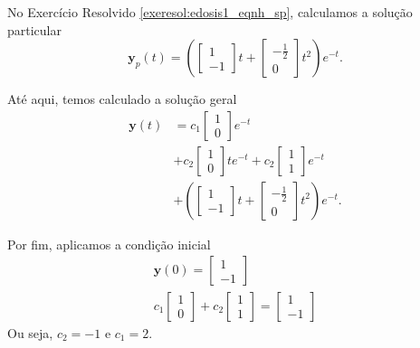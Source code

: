 \begin{resol}
    No Exercício Resolvido \ref{exeresol:edosis1_eqnh_sp}, calculamos a solução particular
    \begin{equation}
      \pmb{y}_p(t) = \left(
      \begin{bmatrix}
        1 \\
        -1
      \end{bmatrix}t +
      \begin{bmatrix}
        -\frac{1}{2} \\
        0
      \end{bmatrix}t^2\right)e^{-t}.
  \end{equation}

  Até aqui, temos calculado a solução geral
  \begin{align}
    \pmb{y}(t) &= c_1\begin{bmatrix}
                     1 \\ 0
                   \end{bmatrix}e^{-t} \\
               &+ c_2\begin{bmatrix}
                     1 \\
                     0
                   \end{bmatrix}te^{-t} +
      c_2\begin{bmatrix}
        1 \\ 1
      \end{bmatrix}e^{-t} \\
               &+ \left(
      \begin{bmatrix}
        1 \\
        -1
      \end{bmatrix}t +
      \begin{bmatrix}
        -\frac{1}{2} \\
        0
      \end{bmatrix}t^2\right)e^{-t}.
  \end{align}

  Por fim, aplicamos a condição inicial
  \begin{gather}
    \pmb{y}(0) =
    \begin{bmatrix}
      1 \\ -1
    \end{bmatrix} \\
    c_1
    \begin{bmatrix}
      1\\ 0
    \end{bmatrix} + c_2
    \begin{bmatrix}
      1\\1
    \end{bmatrix} =     \begin{bmatrix}
      1 \\ -1
    \end{bmatrix}
  \end{gather}
  Ou seja, $c_2=-1$ e $c_1=2$.


\end{resol}
